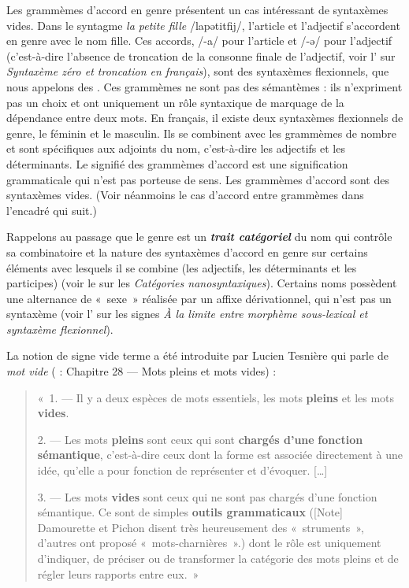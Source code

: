 Les grammèmes d’accord en genre présentent un cas intéressant de syntaxèmes vides. Dans le syntagme \textit{la petite fille} /lapətitfij/, l’article et l’adjectif s’accordent en genre avec le nom fille. Ces accords, /-a/ pour l’article et /-ə/ pour l’adjectif (c’est-à-dire l’absence de troncation de la consonne finale de l’adjectif, voir l’ sur \textit{Syntaxème zéro et troncation en français}), sont des syntaxèmes flexionnels, que nous appelons des . Ces grammèmes ne sont pas des sémantèmes : ils n’expriment pas un choix et ont uniquement un rôle syntaxique de marquage de la dépendance entre deux mots. En français, il existe deux syntaxèmes flexionnels de genre, le féminin et le masculin. Ils se combinent avec les grammèmes de nombre et sont spécifiques aux adjoints du nom, c’est-à-dire les adjectifs et les déterminants. Le signifié des grammèmes d’accord est une signification grammaticale qui n’est pas porteuse de sens. Les grammèmes d’accord sont des syntaxèmes vides. (Voir néanmoins le cas d’accord entre grammèmes dans l’encadré qui suit.)

Rappelons au passage que le genre est un \textbf{\textit{trait catégoriel}} du nom qui contrôle sa combinatoire et la nature des syntaxèmes d’accord en genre sur certains éléments avec lesquels il se combine (les adjectifs, les déterminants et les participes) (voir le  sur les \textit{Catégories nanosyntaxiques}). Certains noms possèdent une alternance de «~sexe~» réalisée par un affixe dérivationnel, qui n’est pas un syntaxème (voir l’ sur les signes \textit{À la limite entre morphème sous-lexical et syntaxème flexionnel}).

La notion de signe vide terme a été introduite par Lucien Tesnière qui parle de \textit{mot vide} (\citeyear{tesniere1959elements} : Chapitre 28 — Mots pleins et mots vides) :
\begin{quote}
    «~1. — Il y a deux espèces de mots essentiels, les mots \textbf{pleins} et les mots \textbf{vides}.

    2. — Les mots \textbf{pleins} sont ceux qui sont \textbf{chargés d’une} \textbf{fonction sémantique}, c’est-à-dire ceux dont la forme est associée directement à une idée, qu’elle a pour fonction de représenter et d’évoquer. […]

    3. — Les mots \textbf{vides} sont ceux qui ne sont pas chargés d’une fonction sémantique. Ce sont de simples \textbf{outils grammaticaux} ([Note] Damourette et Pichon disent très heureusement des «~struments~», d’autres ont proposé «~mots-charnières~».) dont le rôle est uniquement d’indiquer, de préciser ou de transformer la catégorie des mots pleins et de régler leurs rapports entre eux.~»
\end{quote}

